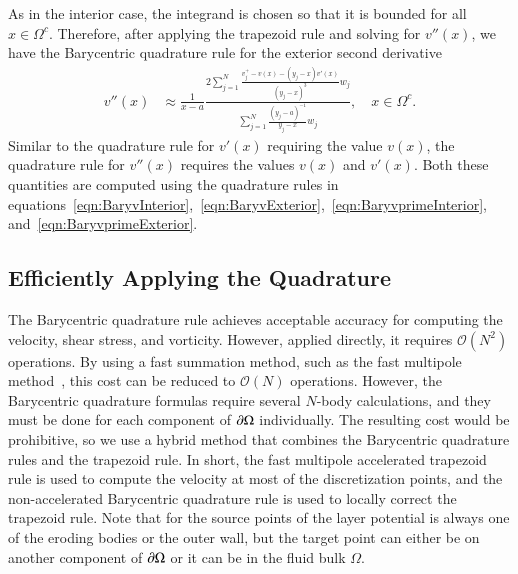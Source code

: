 \documentclass[preprint, 10pt]{elsarticle}
\begin{document}
As in the interior case, the integrand is chosen so that it is bounded
for all $x \in \Omega^c$.  Therefore, after applying the trapezoid rule
and solving for $v''(x)$, we have the Barycentric quadrature rule for
the exterior second derivative
\begin{align}
  v''(x) &\approx \frac{1}{x-a}\frac{2\sum\limits_{j=1}^N
    \frac{v^{+}_{j} - v(x) - (y_j-x)v'(x)}{(y_j-x)^3}w_j}
    {\sum\limits_{j=1}^N \frac{(y_j-a)^{-1}}{y_j-x}w_j}, 
    \quad x \in \Omega^c.
\end{align}
Similar to the quadrature rule for $v'(x)$ requiring the value $v(x)$,
the quadrature rule for $v''(x)$ requires the values $v(x)$ and $v'(x)$.
Both these quantities are computed using the quadrature rules in
equations~\eqref{eqn:BaryvInterior},~\eqref{eqn:BaryvExterior},~\eqref{eqn:BaryvprimeInterior},
and~\eqref{eqn:BaryvprimeExterior}.



\subsection{Efficiently Applying the Quadrature}
\label{sec:fmm}
The Barycentric quadrature rule achieves acceptable accuracy for
computing the velocity, shear stress, and vorticity.  However, applied
directly, it requires $\mathcal{O}(N^2)$ operations.  By using a fast
summation method, such as the fast multipole method~\cite{gre-rok1987},
this cost can be reduced to $\mathcal{O}(N)$ operations.  However, the
Barycentric quadrature formulas require several $N$-body calculations,
and they must be done for each component of ${\partial}\Omega$ individually.
The resulting cost would be prohibitive, so we use a hybrid method that
combines the Barycentric quadrature rules and the trapezoid rule.  In
short, the fast multipole accelerated trapezoid rule is used to compute
the velocity at most of the discretization points, and the
non-accelerated Barycentric quadrature rule is used to locally correct
the trapezoid rule.  Note that for the source points of the layer
potential is always one of the eroding bodies or the outer wall, but the
target point can either be on another component of ${\partial}\Omega$ or it can
be in the fluid bulk $\Omega$.
\end{document}
